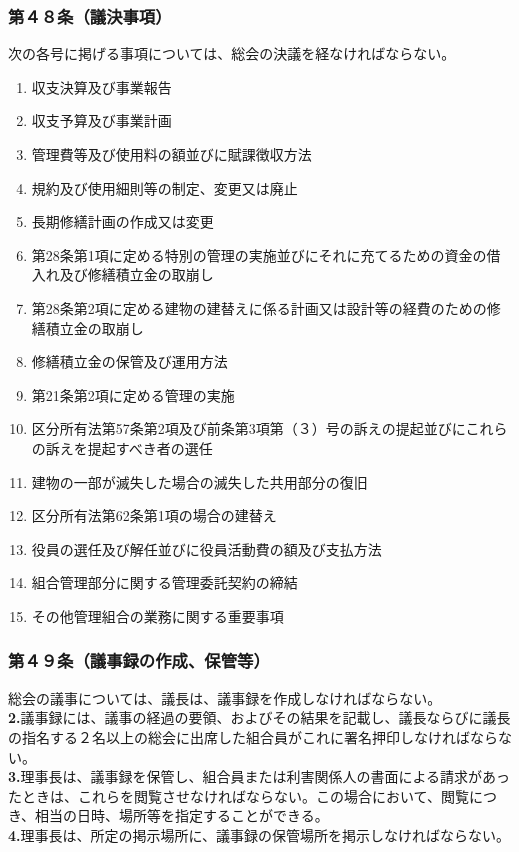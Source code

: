 \documentclass[12pt,uplatex]{jsarticle}
\begin{document}
\subsubsection*{第４８条（議決事項）}
次の各号に掲げる事項については、総会の決議を経なければならない。
\begin{enumerate}
\item 収支決算及び事業報告
\item 収支予算及び事業計画
\item 管理費等及び使用料の額並びに賦課徴収方法
\item 規約及び使用細則等の制定、変更又は廃止
\item 長期修繕計画の作成又は変更
\item 第28条第1項に定める特別の管理の実施並びにそれに充てるための資金の借入れ及び修繕積立金の取崩し
\item 第28条第2項に定める建物の建替えに係る計画又は設計等の経費のための修繕積立金の取崩し
\item 修繕積立金の保管及び運用方法
\item 第21条第2項に定める管理の実施
\item 区分所有法第57条第2項及び前条第3項第（３）号の訴えの提起並びにこれらの訴えを提起すべき者の選任
\item 建物の一部が滅失した場合の滅失した共用部分の復旧
\item 区分所有法第62条第1項の場合の建替え
\item 役員の選任及び解任並びに役員活動費の額及び支払方法
\item 組合管理部分に関する管理委託契約の締結
\item その他管理組合の業務に関する重要事項
\end{enumerate}
\subsubsection*{第４９条（議事録の作成、保管等）}
総会の議事については、議長は、議事録を作成しなければならない。\\
\textbf{2.}議事録には、議事の経過の要領、およびその結果を記載し、議長ならびに議長の指名する２名以上の総会に出席した組合員がこれに署名押印しなければならない。\\
\textbf{3.}理事長は、議事録を保管し、組合員または利害関係人の書面による請求があったときは、これらを閲覧させなければならない。この場合において、閲覧につき、相当の日時、場所等を指定することができる。\\
\textbf{4.}理事長は、所定の掲示場所に、議事録の保管場所を掲示しなければならない。\\
\end{document}
